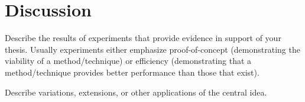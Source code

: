 \chapter{Discussion}
\thispagestyle{fancy}
\label{c:discussion}

Describe the results of experiments that provide evidence in support of your thesis. Usually experiments either emphasize proof-of-concept (demonstrating the viability of a method/technique) or efficiency (demonstrating that a method/technique provides better performance than those that exist).

Describe variations, extensions, or other applications of the central idea.
